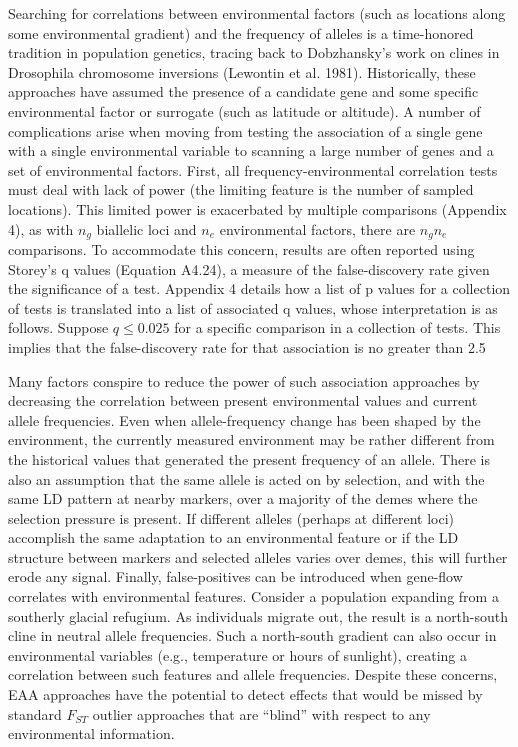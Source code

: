 \documentclass{article}
\begin{document}
Searching for correlations between environmental factors (such as locations along some environmental gradient) and the frequency of alleles is a time-honored tradition in population genetics, tracing back to Dobzhansky's work on clines in Drosophila chromosome inversions (Lewontin et al. 1981). Historically, these approaches have assumed the presence of a candidate gene and some specific environmental factor or surrogate (such as latitude or altitude). A number of complications arise when moving from testing the association of a single gene with a single environmental variable to scanning a large number of genes and a set of environmental factors. First, all frequency-environmental correlation tests must deal with lack of power (the limiting feature is the number of sampled locations). This limited power is exacerbated by multiple comparisons (Appendix 4), as with  $ n_{g} $ biallelic loci and  $ n_{e} $ environmental factors, there are  $ n_{g}n_{e} $ comparisons. To accommodate this concern, results are often reported using Storey's q values (Equation A4.24), a measure of the false-discovery rate given the significance of a test. Appendix 4 details how a list of p values for a collection of tests is translated into a list of associated q values, whose interpretation is as follows. Suppose  $ q \leq 0.025 $ for a specific comparison in a collection of tests. This implies that the false-discovery rate for that association is no greater than 2.5%

Many factors conspire to reduce the power of such association approaches by decreasing the correlation between present environmental values and current allele frequencies. Even when allele-frequency change has been shaped by the environment, the currently measured environment may be rather different from the historical values that generated the present frequency of an allele. There is also an assumption that the same allele is acted on by selection, and with the same LD pattern at nearby markers, over a majority of the demes where the selection pressure is present. If different alleles (perhaps at different loci) accomplish the same adaptation to an environmental feature or if the LD structure between markers and selected alleles varies over demes, this will further erode any signal. Finally, false-positives can be introduced when gene-flow correlates with environmental features. Consider a population expanding from a southerly glacial refugium. As individuals migrate out, the result is a north-south cline in neutral allele frequencies. Such a north-south gradient can also occur in environmental variables (e.g., temperature or hours of sunlight), creating a correlation between such features and allele frequencies. Despite these concerns, EAA approaches have the potential to detect effects that would be missed by standard  $ F_{ST} $ outlier approaches that are “blind” with respect to any environmental information.
\end{document}
